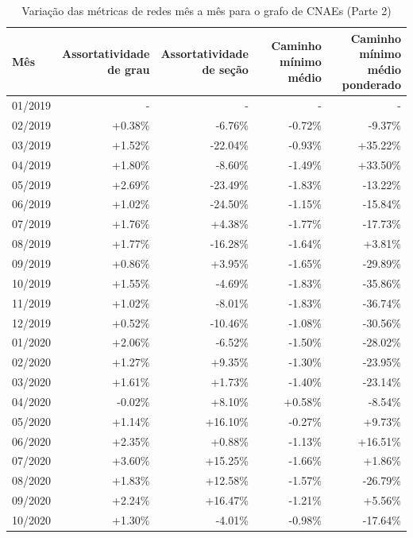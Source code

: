 \begin{table}[htb]
\centering
\caption{Variação das métricas de redes mês a mês para o grafo de CNAEs (Parte 2)}
\label{tab:metricas-redes-pandemia:grafo-mensal-por-cnae2}
\begin{tabular}{l|rrrr}
\toprule
Mês & \shortstack{Assortatividade\\de grau} & \shortstack{Assortatividade\\de seção} & \shortstack{Caminho mínimo\\médio} & \shortstack{Caminho mínimo\\médio ponderado} \\
\midrule
01/2019 & - & - & - & - \\
02/2019 &  +0.38\% &  -6.76\% & -0.72\% &  -9.37\% \\
03/2019 &  +1.52\% & -22.04\% & -0.93\% & +35.22\% \\
04/2019 &  +1.80\% &  -8.60\% & -1.49\% & +33.50\% \\
05/2019 &  +2.69\% & -23.49\% & -1.83\% & -13.22\% \\
06/2019 &  +1.02\% & -24.50\% & -1.15\% & -15.84\% \\
07/2019 &  +1.76\% &  +4.38\% & -1.77\% & -17.73\% \\
08/2019 &  +1.77\% & -16.28\% & -1.64\% &  +3.81\% \\
09/2019 &  +0.86\% &  +3.95\% & -1.65\% & -29.89\% \\
10/2019 &  +1.55\% &  -4.69\% & -1.83\% & -35.86\% \\
11/2019 &  +1.02\% &  -8.01\% & -1.83\% & -36.74\% \\
12/2019 &  +0.52\% & -10.46\% & -1.08\% & -30.56\% \\
01/2020 &  +2.06\% &  -6.52\% & -1.50\% & -28.02\% \\
02/2020 &  +1.27\% &  +9.35\% & -1.30\% & -23.95\% \\
03/2020 &  +1.61\% &  +1.73\% & -1.40\% & -23.14\% \\
04/2020 &  -0.02\% &  +8.10\% & +0.58\% &  -8.54\% \\
05/2020 &  +1.14\% & +16.10\% & -0.27\% &  +9.73\% \\
06/2020 &  +2.35\% &  +0.88\% & -1.13\% & +16.51\% \\
07/2020 &  +3.60\% & +15.25\% & -1.66\% &  +1.86\% \\
08/2020 &  +1.83\% & +12.58\% & -1.57\% & -26.79\% \\
09/2020 &  +2.24\% & +16.47\% & -1.21\% &  +5.56\% \\
10/2020 &  +1.30\% &  -4.01\% & -0.98\% & -17.64\% \\
\bottomrule
\end{tabular}
\fdadospesquisa
\end{table}

